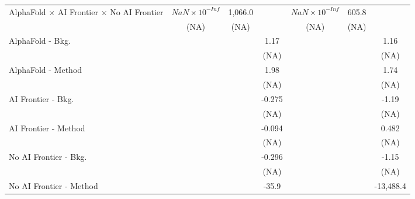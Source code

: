 \begin{tabular}{lcccccc}
   AlphaFold $\times$ AI Frontier $\times$ No AI Frontier                     & $NaN\times 10^{-Inf}$  & 1,066.0 &          & $NaN\times 10^{-Inf}$  & 605.8 &   \\   
                                                                              & (NA)                   & (NA)    &          & (NA)                   & (NA)  &   \\   
   AlphaFold - Bkg.                                                           &                        &         & 1.17     &                        &       & 1.16\\   
                                                                              &                        &         & (NA)     &                        &       & (NA)\\   
   AlphaFold - Method                                                         &                        &         & 1.98     &                        &       & 1.74\\   
                                                                              &                        &         & (NA)     &                        &       & (NA)\\   
   AI Frontier - Bkg.                                                         &                        &         & -0.275   &                        &       & -1.19\\   
                                                                              &                        &         & (NA)     &                        &       & (NA)\\   
   AI Frontier - Method                                                       &                        &         & -0.094   &                        &       & 0.482\\   
                                                                              &                        &         & (NA)     &                        &       & (NA)\\   
   No AI Frontier - Bkg.                                                      &                        &         & -0.296   &                        &       & -1.15\\   
                                                                              &                        &         & (NA)     &                        &       & (NA)\\   
   No AI Frontier - Method                                                    &                        &         & -35.9    &                        &       & -13,488.4\\   

\end{tabular}
